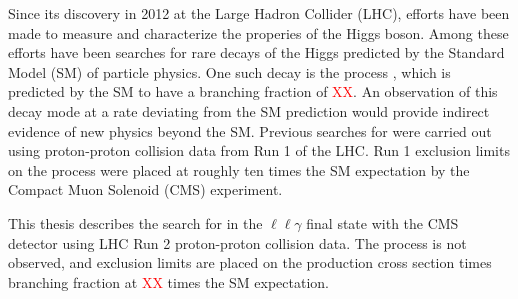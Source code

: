 \abstract
    
    Since its discovery in 2012 at the Large Hadron Collider (LHC), efforts have been made 
to measure and characterize the properies of the Higgs boson. Among these efforts have
been searches for rare decays of the Higgs predicted by the Standard Model (SM) of particle
physics. One such decay is the process \hzg, which is predicted
by the SM to have a branching fraction of \textcolor{red}{XX}. An observation 
of this decay mode at a rate deviating from the SM prediction would provide indirect 
evidence of new physics beyond the SM. Previous searches for \hzg 
were carried out using proton-proton collision data from Run 1 of the LHC. Run 1 exclusion
limits on the process were placed at roughly ten times the SM expectation by 
the Compact Muon Solenoid (CMS) experiment. 

    This thesis describes the search for \hzg in the $\ell\ell\gamma$ 
final state with the CMS detector using LHC Run 2 proton-proton collision data. 
The process is not observed, and exclusion limits are placed on the production cross section 
times branching fraction at \textcolor{red}{XX} times the SM expectation.
